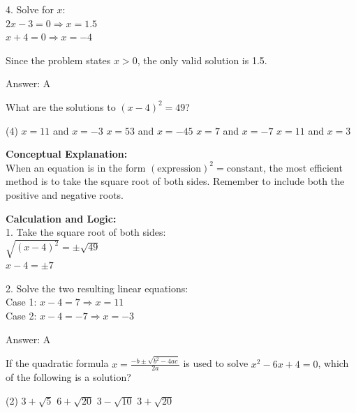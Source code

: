 \documentclass[11pt,paper=a4,answers]{exam}
\begin{document}
\begin{questions}
\begin{solution}
4. Solve for $x$: \\
   $2x - 3 = 0 \Rightarrow x = 1.5$ \\
   $x + 4 = 0 \Rightarrow x = -4$

\vspace{10pt}

Since the problem states $x > 0$, the only valid solution is 1.5.

\vspace{20pt}

Answer: \colorbox{yellow!100}{A}
\end{solution}

\vspace{30pt}

\question
What are the solutions to $(x - 4)^2 = 49$?
\begin{tasks}(4)
    \task $x = 11$ and $x = -3$
    \task $x = 53$ and $x = -45$
    \task $x = 7$ and $x = -7$
    \task $x = 11$ and $x = 3$
\end{tasks}

\begin{solution}
\textbf{Conceptual Explanation:} \\
When an equation is in the form $(\text{expression})^2 = \text{constant}$, the most efficient method is to take the square root of both sides. Remember to include both the positive and negative roots.

\vspace{15pt}

\textbf{Calculation and Logic:} \\
1. Take the square root of both sides: \\
   $\sqrt{(x - 4)^2} = \pm \sqrt{49}$ \\
   $x - 4 = \pm 7$

\vspace{10pt}

2. Solve the two resulting linear equations: \\
   Case 1: $x - 4 = 7 \Rightarrow x = 11$ \\
   Case 2: $x - 4 = -7 \Rightarrow x = -3$

\vspace{20pt}

Answer: \colorbox{yellow!100}{A}
\end{solution}

\vspace{30pt}

\question
If the quadratic formula $x = \frac{-b \pm \sqrt{b^2 - 4ac}}{2a}$ is used to solve $x^2 - 6x + 4 = 0$, which of the following is a solution?
\begin{tasks}(2)
    \task $3 + \sqrt{5}$
    \task $6 + \sqrt{20}$
    \task $3 - \sqrt{10}$
    \task $3 + \sqrt{20}$
\end{tasks}


\end{questions}
\end{document}
